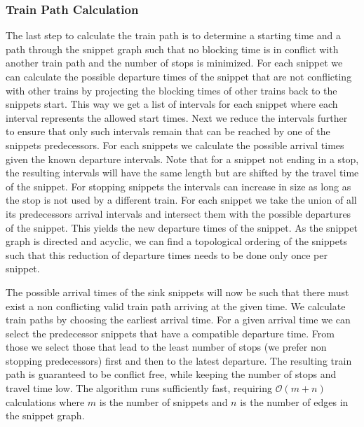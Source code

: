 \subsubsection{Train Path Calculation}
%
The last step to calculate the train path is to determine a starting time and a path through the snippet graph such that no blocking time is in conflict with another train path and the number of stops is minimized. For each snippet we can calculate the possible departure times of the snippet that are not conflicting with other trains by projecting the blocking times of other trains back to the snippets start. This way we get a list of intervals for each snippet where each interval represents the allowed start times. Next we reduce the intervals further to ensure that only such intervals remain that can be reached by one of the snippets predecessors. For each snippets we calculate the possible arrival times given the known departure intervals. Note that for a snippet not ending in a stop, the resulting intervals will have the same length but are shifted by the travel time of the snippet. For stopping snippets the intervals can increase in size as long as the stop is not used by a different train. For each snippet we take the union of all its predecessors arrival intervals and intersect them with the possible departures of the snippet. This yields the new departure times of the snippet. As the snippet graph is directed and acyclic, we can find a topological ordering of the snippets such that this reduction of departure times needs to be done only once per snippet.

The possible arrival times of the sink snippets will now be such that there must exist a non conflicting valid train path arriving at the given time. We calculate train paths by choosing the earliest arrival time. For a given arrival time we can select the predecessor snippets that have a compatible departure time. From those we select those that lead to the least number of stops (we prefer non stopping predecessors) first and then to the latest departure. The resulting train path is guaranteed to be conflict free, while keeping the number of stops and travel time low. The algorithm runs sufficiently fast, requiring $\mathcal{O}(m+n)$ calculations where $m$ is the number of snippets and $n$ is the number of edges in the snippet graph.

